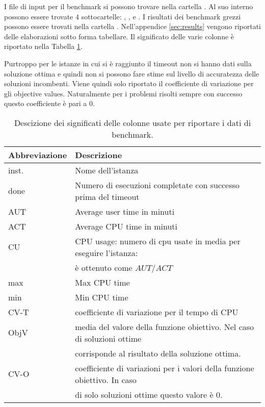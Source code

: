 I file di input per il benchmark si possono trovare nella cartella .
Al suo interno possono essere trovate $4$ sottocartelle: , 
,  e .
I risultati dei benchmark grezzi possono essere trovati nella cartella 
. Nell'appendice  \ref{sec:results} vengono riportati delle
elaborazioni sotto forma tabellare.
Il significato delle varie colonne è riportato nella Tabella \ref{table:description}.

Purtroppo per le istanze in cui si è raggiunto il timeout non si hanno dati
sulla soluzione ottima e quindi non si possono 
fare stime sul livello di accuratezza delle soluzioni incombenti.
Viene quindi solo riportato il coefficiente di variazione per gli
objective values. Naturalmente 
per i problemi risolti sempre con successo questo coefficiente è pari a $0$.

\begin{table}
\centering
\small
\begin{tabular}{| l| l |}
\hline
Abbreviazione & Descrizione \\
\hline
inst. & Nome dell'istanza \\
done & Numero di esecuzioni completate con successo prima del timeout\\
AUT & Average user time in minuti \\
ACT & Average CPU time in minuti\\
CU  & CPU usage: numero di cpu usate in media per eseguire l'istanza: \\
	& è ottenuto come $AUT/ACT$\\
max & Max CPU time \\
min & Min CPU time \\
CV-T & coefficiente di variazione per il tempo di CPU \\
ObjV & media del valore della funzione obiettivo. Nel caso di soluzioni ottime \\
	& corrisponde al risultato della soluzione ottima.\\
CV-O & coefficiente di variazioni per i valori della funzione obiettivo. In caso \\
& di solo soluzioni ottime questo valore è $0$. \\
\hline
\end{tabular}
\caption{Descizione dei significati delle colonne usate per riportare i dati
di benchmark.}
\label{table:description}
\end{table}


